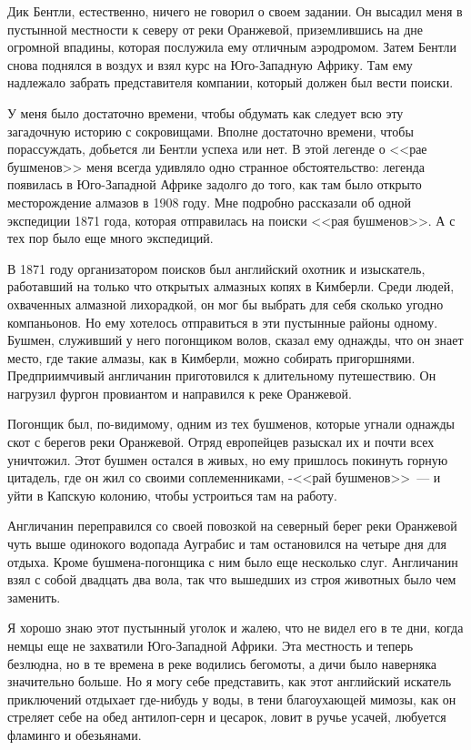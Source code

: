 \documentclass[12pt,a4paper,twoside,openany,svgnames]{memoir}
\begin{document}
Дик Бентли, естественно, ничего не говорил о своем задании. Он высадил меня в пустынной местности к северу от реки Оранжевой, приземлившись на дне огромной впадины, которая послужила ему отличным аэродромом. Затем Бентли снова поднялся в воздух и взял курс на Юго-Западную Африку. Там ему надлежало забрать представителя компании, который должен был вести поиски.

У меня было достаточно времени, чтобы обдумать как следует всю эту загадочную историю с сокровищами. Вполне достаточно времени, чтобы порассуждать, добьется ли Бентли успеха или нет. В этой легенде о <<рае бушменов>> меня всегда удивляло одно странное обстоятельство: легенда появилась в Юго-Западной Африке задолго до того, как там было открыто месторождение алмазов в 1908 году. Мне подробно рассказали об одной экспедиции 1871 года, которая отправилась на поиски <<рая бушменов>>. А с тех пор было еще много экспедиций.

В 1871 году организатором поисков был английский охотник и изыскатель, работавший на только что открытых алмазных копях в Кимберли. Среди людей, охваченных алмазной лихорадкой, он мог бы выбрать для себя сколько угодно компаньонов. Но ему хотелось отправиться в эти пустынные районы одному. Бушмен, служивший у него погонщиком волов, сказал ему однажды, что он знает место, где такие алмазы, как в Кимберли, можно собирать пригоршнями. Предприимчивый англичанин приготовился к длительному путешествию. Он нагрузил фургон провиантом и направился к реке Оранжевой.

Погонщик был, по-видимому, одним из тех бушменов, которые угнали однажды скот с берегов реки Оранжевой. Отряд европейцев разыскал их и почти всех уничтожил. Этот бушмен остался в живых, но ему пришлось покинуть горную цитадель, где он жил со своими соплеменниками, -<<рай бушменов>>~--- и уйти в Капскую колонию, чтобы устроиться там на работу.

Англичанин переправился со своей повозкой на северный берег реки Оранжевой чуть выше одинокого водопада Ауграбис и там остановился на четыре дня для отдыха. Кроме бушмена-погонщика с ним было еще несколько слуг. Англичанин взял с собой двадцать два вола, так что вышедших из строя животных было чем заменить.

Я хорошо знаю этот пустынный уголок и жалею, что не видел его в те дни, когда немцы еще не захватили Юго-Западной Африки. Эта местность и теперь безлюдна, но в те времена в реке водились бегомоты, а дичи было наверняка значительно больше. Но я могу себе представить, как этот английский искатель приключений отдыхает где-нибудь у воды, в тени благоухающей мимозы, как он стреляет себе на обед антилоп-серн и цесарок, ловит в ручье усачей, любуется фламинго и обезьянами.
\end{document}
